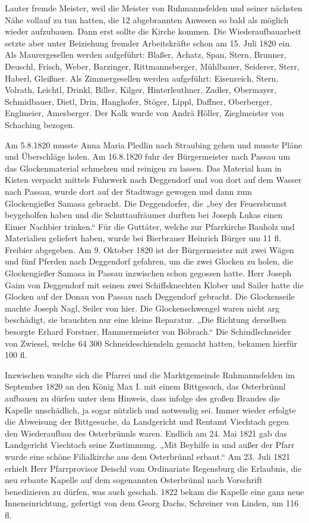 \documentclass[12pt,a4paper]{book}
\begin{document}
Lauter fremde Meister, weil die Meister von Ruhmannsfelden und seiner nächsten
Nähe vollauf zu tun hatten, die 12 abgebrannten Anwesen so bald als möglich
wieder aufzubauen. Dann erst sollte die Kirche kommen. Die Wiederaufbauarbeit
setzte aber unter Beiziehung fremder Arbeitskräfte schon am 15. Juli 1820 ein.
Als Maurergesellen werden aufgeführt: Blaßer, Achatz, Span, Stern, Brunner,
Deuschl, Frisch, Weber, Barzinger, Rittmannsberger, Mühlbauer, Seiderer, Sterr,
Haberl, Gleißner. Als Zimmergesellen werden aufgeführt: Eisenreich, Stern,
Volrath, Leichtl, Drinkl, Biller, Kilger, Hinterleuthner, Zadler, Obermayer,
Schmidbauer, Dietl, Drin, Hanghofer, Stöger, Lippl, Daffner, Oberberger,
Englmeier, Amesberger. Der Kalk wurde von Andrä Höller, Zieglmeister von
Schaching bezogen.

Am 5.8.1820 musste Anna Maria Pledlin nach Straubing gehen und musste Pläne und
Überschläge holen. Am 16.8.1820 fuhr der Bürgermeister nach Passau um das
Glockenmaterial schmelzen und reinigen zu lassen. Das Material kam in Kisten
verpackt mittels Fuhrwerk nach Deggendorf und von dort auf dem Wasser nach
Passau, wurde dort auf der Stadtwage gewogen und dann zum Glockengießer Samasa
gebracht. Die Deggendorfer, die „bey der Feuersbrunst beygeholfen haben und die
Schuttaufräumer durften bei Joseph Lukas einen Eimer Nachbier trinken.“ Für die
Guttäter, welche zur Pfarrkirche Bauholz und Materialien geliefert haben, wurde
bei Bierbrauer Heinrich Bürger um 11 fl. Freibier abgegeben. Am 9. Oktober 1820
ist der Bürgermeister mit zwei Wägen und fünf Pferden nach Deggendorf gefahren,
um die zwei Glocken zu holen, die Glockengießer Samasa in Passau inzwischen
schon gegossen hatte. Herr Joseph Gaim von Deggendorf mit seinen zwei
Schiffsknechten Klober und Sailer hatte die Glocken auf der Donau von Passau
nach Deggendorf gebracht. Die Glockenseile machte Joseph Nagl, Seiler von hier.
Die Glockenschwengel waren nicht arg beschädigt, sie brauchten nur eine kleine
Reparatur. „Die Richtung derselben besorgte Erhard Forstner, Hammermeister von
Böbrach.“ Die Schindlschneider von Zwiesel, welche 64 300 Schneideschiendeln
gemacht hatten, bekamen hierfür 100 fl.

Inzwischen wandte sich die Pfarrei und die Marktgemeinde Ruhmannsfelden im
September 1820 an den König Max I. mit einem Bittgesuch, das Osterbrünnl
aufbauen zu dürfen unter dem Hinweis, dass infolge des großen Brandes die
Kapelle unschädlich, ja sogar nützlich und notwendig sei. Immer wieder erfolgte
die Abweisung der Bittgesuche, da Landgericht und Rentamt Viechtach gegen den
Wiederaufbau des Osterbrünnls waren. Endlich am 24. Mai 1821 gab das Landgericht
Viechtach seine Zustimmung. „Mit Beyhilfe in und außer der Pfarr wurde eine
schöne Filialkirche aus dem Osterbrünnl erbaut.“ Am 23. Juli 1821 erhielt Herr
Pfarrprovisor Deischl vom Ordinariate Regensburg die Erlaubnis, die neu erbaute
Kapelle auf dem sogenannten Osterbrünnl nach Vorschrift benedizieren zu dürfen,
was auch geschah. 1822 bekam die Kapelle eine ganz neue Inneneinrichtung,
gefertigt von dem Georg Dachs, Schreiner von Linden, um 116 fl.
\end{document}
